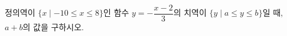 \hspace*{2mm}\begin{minipage}[t]{\dimexpr\linewidth-2mm\relax}\vspace{0pt}
정의역이 $\{x\mid -10\le x\le 8\}$인 함수 $y=-\dfrac{x-2}{3}$의 치역이 $\{y\mid a\le y\le b\}$일 때, $a+b$의 값을 구하시오. \end{minipage}
